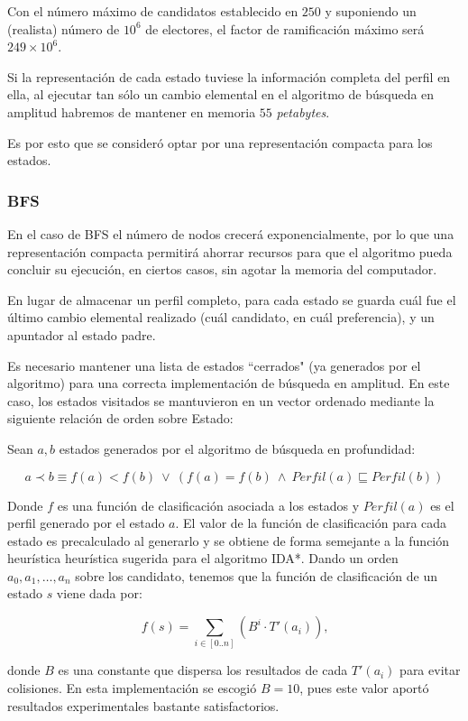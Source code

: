 \documentclass[letterpaper,12pt, titlepage]{article}
\begin{document}
Con el número máximo de candidatos establecido en
$250$ y suponiendo un (realista) número de $10^6$ de electores,
el factor de ramificación máximo será $249\times 10^6$.

Si la representación de cada estado tuviese la información
completa del perfil en ella, al ejecutar tan sólo un 
cambio elemental en el algoritmo de
búsqueda en amplitud habremos de mantener en memoria $55$
\textit{petabytes}.

Es por esto que se consideró 
optar por una representación compacta para los estados.

\subsubsection*{BFS}

En el caso de BFS el número de
nodos crecerá exponencialmente, por lo que una representación
compacta permitirá ahorrar recursos para que el algoritmo pueda
concluir su ejecución, en ciertos casos, sin agotar la memoria
del computador.

En lugar de almacenar un perfil completo, para cada estado
se guarda cuál fue el último cambio elemental realizado (cuál
candidato, en cuál preferencia), y un apuntador al estado padre.

Es necesario mantener una lista de estados ``cerrados" (ya
generados por el algoritmo) para una correcta implementación
de búsqueda en amplitud. En este caso, los estados visitados
se mantuvieron en un vector ordenado mediante la siguiente
relación de orden sobre Estado:

Sean $a, b$ estados generados por el algoritmo de búsqueda en
profundidad:

$$a \prec b \equiv f(a) < f(b) \ \vee \ (f(a) = f(b) \ \wedge \ Perfil(a) \sqsubseteq Perfil(b))$$

Donde $f$ es una función de clasificación asociada a los
estados y $Perfil(a)$ es el perfil generado por el estado
$a$. El valor de la función de clasificación para cada estado 
es precalculado al generarlo y se obtiene de forma semejante
a la función heurística heurística sugerida para el algoritmo
IDA*. Dando un orden $a_0, a_1, \ldots, a_n$ sobre los candidato,
tenemos que la función de clasificación de un estado $s$ viene
dada por:

$$\displaystyle f(s) = \sum_{i\in [0..n]} (B^i\cdot T'(a_i))\mbox{,}$$
    
\noindent donde $B$ es una constante que dispersa los
resultados de cada $T'(a_i)$ para evitar colisiones.
En esta implementación se escogió $B=10$, pues
este valor aportó resultados experimentales bastante satisfactorios.
\end{document}
